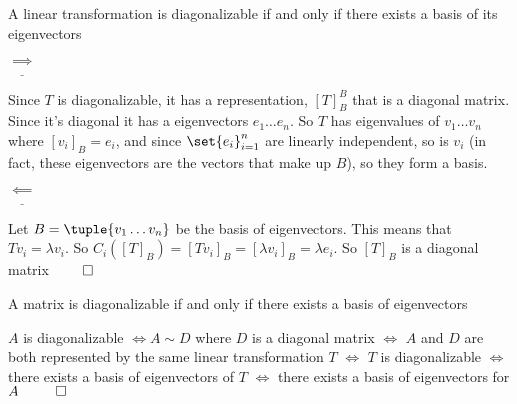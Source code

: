 \documentclass[10pt]{article}
\begin{document}
\begin{theorem}[sumGeomDiagEq]{A linear transformation is diagonalizable if and only if there exists a basis of its eigenvectors}

$\underline{\implies}$ \begin{minipage}[t]{\dimexpr\textwidth-2cm}

Since $T$ is diagonalizable, it has a representation, $[T]^B_B$ that is a diagonal matrix. Since it's diagonal it has a eigenvectors $e_1\dots e_n$. So $T$ has eigenvalues of $v_1\dots v_n$ where $[v_i]_B = e_i$, and since $\set{e_i}_{i=1}^n$ are linearly independent, so is $v_i$ (in fact, these eigenvectors are the vectors that make up $B$), so they form a basis.

\end{minipage}

\medskip

$\underline{\impliedby}$ \begin{minipage}[t]{\dimexpr\textwidth-2cm}

Let $B=\tuple{v_1\dots v_n}$ be the basis of eigenvectors. This means that $Tv_i=\lambda v_i$. So $C_i([T]_B)= [Tv_i]_B = [\lambda v_i]_B = \lambda e_i$. So $[T]_B$ is a diagonal matrix $\qed$

\end{minipage}

\end{theorem}

\begin{corollary}{A matrix is diagonalizable if and only if there exists a basis of eigenvectors}

$A$ is diagonalizable $\iff A\sim D$ where $D$ is a diagonal matrix $\iff$ $A$ and $D$ are both represented by the same linear transformation $T$ $\iff$ $T$ is diagonalizable $\iff$ there exists a basis of eigenvectors of $T$ $\iff$ there exists a basis of eigenvectors for $A ~~\qed$

\end{corollary}
\end{document}
